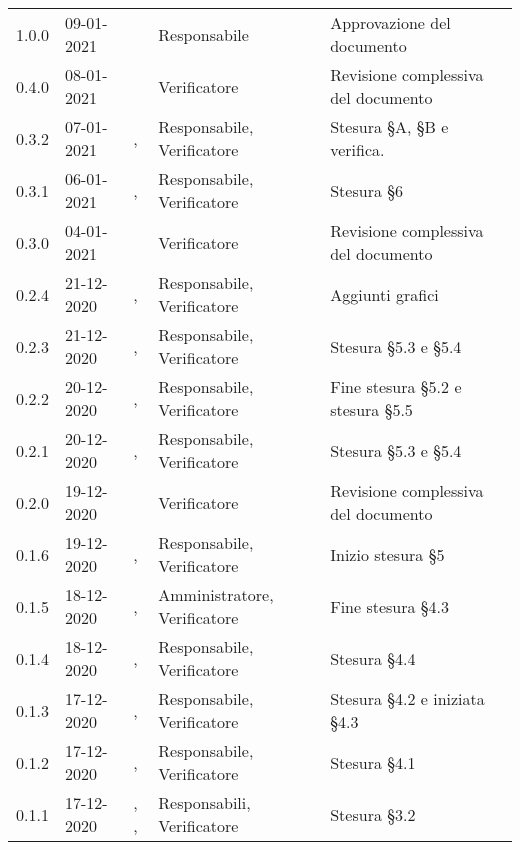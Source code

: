 {{\begin{longtable}{C{1.7cm} C{2.5cm} C{3.2cm} C{2.7cm} C{4.8cm}}
1.0.0 & 09-01-2021 & \SG{} & Responsabile & Approvazione del documento \\

0.4.0 & 08-01-2021 & \ZM{} & Verificatore & Revisione complessiva del documento \\

0.3.2 & 07-01-2021 & \BM{}, \ZM{} & Responsabile, Verificatore & Stesura \S A, \S B e verifica. \\

0.3.1 & 06-01-2021 & \BM{}, \SH{} & Responsabile, Verificatore & Stesura \S 6\\

0.3.0 & 04-01-2021 & \SH{} & Verificatore & Revisione complessiva del documento \\

0.2.4 & 21-12-2020 & \SG{}, \SH{} & Responsabile, Verificatore & Aggiunti grafici \\

0.2.3 & 21-12-2020 & \BM{}, \ZM{} & Responsabile, Verificatore & Stesura \S 5.3 e \S 5.4\\

0.2.2 & 20-12-2020 & \SG{}, \ZM{} & Responsabile, Verificatore & Fine stesura \S 5.2 e stesura \S 5.5 \\

0.2.1 & 20-12-2020 & \BM{}, \ZM{} & Responsabile, Verificatore & Stesura \S 5.3 e \S 5.4\\

0.2.0 & 19-12-2020 & \ZM{} & Verificatore & Revisione complessiva del documento \\

0.1.6 & 19-12-2020 & \SG{}, \SH{} & Responsabile, Verificatore & Inizio stesura \S 5 \\

0.1.5 & 18-12-2020 & \PA{}, \SH{} & Amministratore, Verificatore & Fine stesura \S 4.3\\

0.1.4 & 18-12-2020 & \SG{}, \ZM{} & Responsabile, Verificatore & Stesura \S 4.4 \\

0.1.3 & 17-12-2020 & \BM{}, \ZM{} & Responsabile, Verificatore & Stesura \S 4.2 e iniziata \S 4.3 \\

0.1.2 & 17-12-2020 & \SG{}, \ZM{} & Responsabile, Verificatore & Stesura \S 4.1 \\

0.1.1 & 17-12-2020 & \SG{}, \BM{}, \SH{} & Responsabili, Verificatore & Stesura \S 3.2 \\


\end{longtable}}}
